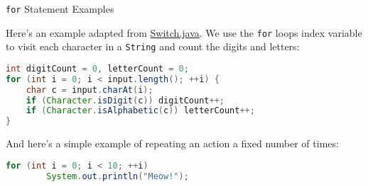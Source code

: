 \documentclass{beamer}
\newcommand{\code}{http://www.cc.gatech.edu/~simpkins/teaching/gatech/cs1331/code}
\begin{document}
\begin{frame}[fragile]{{\tt for} Statement Examples}


Here's an example adapted from  \href{\code/Switch.java}{Switch.java}.  We use the {\tt for} loops index variable to visit each character in a {\tt String} and count the digits and letters:
\begin{lstlisting}[language=Java]
int digitCount = 0, letterCount = 0;
for (int i = 0; i < input.length(); ++i) {
    char c = input.charAt(i);
    if (Character.isDigit(c)) digitCount++;
    if (Character.isAlphabetic(c)) letterCount++;
}
\end{lstlisting}

And here's a simple example of repeating an action a fixed number of times:
\begin{lstlisting}[language=Java]
for (int i = 0; i < 10; ++i)
        System.out.println("Meow!");
\end{lstlisting}



\end{frame}
\end{document}
